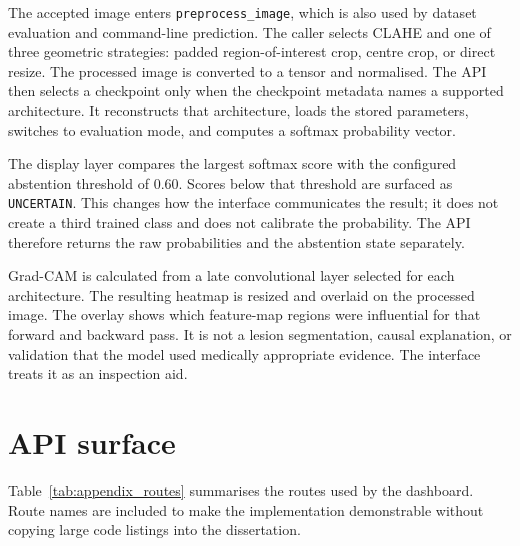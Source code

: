The accepted image enters \texttt{preprocess\_image}, which is also used by dataset evaluation and command-line prediction. The caller selects CLAHE and one of three geometric strategies: padded region-of-interest crop, centre crop, or direct resize. The processed image is converted to a tensor and normalised. The API then selects a checkpoint only when the checkpoint metadata names a supported architecture. It reconstructs that architecture, loads the stored parameters, switches to evaluation mode, and computes a softmax probability vector.

The display layer compares the largest softmax score with the configured abstention threshold of 0.60. Scores below that threshold are surfaced as \texttt{UNCERTAIN}. This changes how the interface communicates the result; it does not create a third trained class and does not calibrate the probability. The API therefore returns the raw probabilities and the abstention state separately.

Grad-CAM is calculated from a late convolutional layer selected for each architecture. The resulting heatmap is resized and overlaid on the processed image. The overlay shows which feature-map regions were influential for that forward and backward pass. It is not a lesion segmentation, causal explanation, or validation that the model used medically appropriate evidence. The interface treats it as an inspection aid.

\section{API surface}

Table~\ref{tab:appendix_routes} summarises the routes used by the dashboard. Route names are included to make the implementation demonstrable without copying large code listings into the dissertation.

